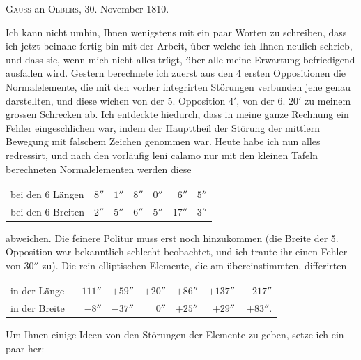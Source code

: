 \par\bigskip
\begin{center}
\textsc{Gauss} an \textsc{Olbers}, 30. November 1810.
\end{center}
\noindent\hspace*{\parindent}Ich kann nicht umhin, Ihnen wenigstens mit ein paar Worten zu schreiben, dass ich jetzt beinahe fertig bin mit der Arbeit, über welche ich Ihnen neulich schrieb, und dass sie, wenn mich nicht alles trügt, über alle meine Erwartung befriedigend ausfallen wird. Gestern berechnete ich zuerst aus den 4 ersten Oppositionen die Normalelemente, die mit den vorher integrirten Störungen verbunden jene genau darstellten, und diese wichen von der 5. Opposition \(4'\), von der 6. \(20'\) zu meinem grossen Schrecken ab. Ich entdeckte hiedurch, dass in meine ganze Rechnung ein Fehler eingeschlichen war, indem der Haupttheil der Störung der mittlern Bewegung mit falschem Zeichen genommen war. Heute habe ich nun alles redressirt, und nach den vorläufig leni calamo nur mit den kleinen Tafeln berechneten Normalelementen werden diese
\begin{center}\begingroup\small\setlength{\tabcolsep}{4pt}
\begin{tabular}{lrrrrrr}
bei den 6 Längen & \(8''\) & \(1''\) & \(8''\) & \(0''\) & \(6''\) & \(5''\)\\
bei den 6 Breiten & \(2''\) & \(5''\) & \(6''\) & \(5''\) & \(17''\) & \(3''\)\\
\end{tabular}\endgroup\end{center}
abweichen. Die feinere Politur muss erst noch hinzukommen (die Breite der 5. Opposition war bekanntlich schlecht beobachtet, und ich traute ihr einen Fehler von \(30''\) zu). Die rein elliptischen Elemente, die am  übereinstimmten, differirten
\begin{center}\begingroup\small\setlength{\tabcolsep}{4pt}
\begin{tabular}{lrrrrrr}
in der Länge & \(-111''\) & \(+59''\) & \(+20''\) & \(+86''\) & \(+137''\) & \(-217''\)\\
in der Breite & \(-8''\) & \(-37''\) & \(0''\) & \(+25''\) & \(+29''\) & \(+83''.\)\\
\end{tabular}\endgroup\end{center}
\par
\noindent\hspace*{\parindent}Um Ihnen einige Ideen von den Störungen der Elemente zu geben, setze ich ein paar her:
